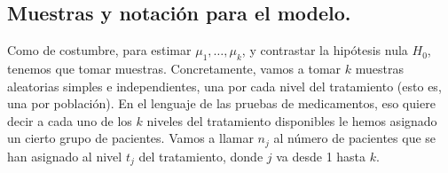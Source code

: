 \subsection{Muestras y notación para el modelo.}
\label{cap10:subsec:MuestrasNotacionModelo}

Como de costumbre, para estimar $\mu_1,\ldots,\mu_k$, y contrastar la hipótesis nula $H_0$, tenemos que tomar muestras. Concretamente, vamos a tomar $k$ muestras aleatorias simples e independientes, una por cada nivel del tratamiento (esto es, una por población). En el lenguaje de las pruebas de medicamentos, eso quiere decir a cada uno de los $k$ niveles del tratamiento disponibles le hemos asignado un cierto grupo de pacientes. Vamos a llamar $n_j$ al número de pacientes que se han asignado al nivel $t_j$ del tratamiento, donde $j$ va desde 1 hasta $k$.

